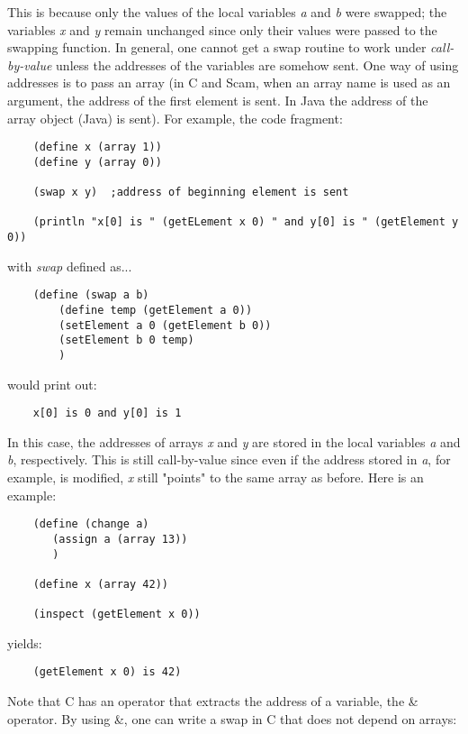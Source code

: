 This is because only the values of the local variables {\it a} and {\it b}
were swapped; the variables {\it x} and {\it y} remain unchanged
since only their values were passed to the swapping function.
In
general, one cannot get a swap routine to work under {\it call-by-value}
unless the addresses of the variables are somehow sent. One way of
using addresses is to pass an array (in C and Scam, when an array name
is used as an argument, the address of the first element is sent. In Java
the address of the array
object (Java) is sent). For example,
the code fragment:

\begin{verbatim}
    (define x (array 1))
    (define y (array 0))

    (swap x y)  ;address of beginning element is sent

    (println "x[0] is " (getELement x 0) " and y[0] is " (getElement y 0))
\end{verbatim}

with {\it swap} defined as...

\begin{verbatim}
    (define (swap a b)
        (define temp (getElement a 0))
        (setElement a 0 (getElement b 0))
        (setElement b 0 temp)
        )
\end{verbatim}

would print out:

\begin{verbatim}
    x[0] is 0 and y[0] is 1
\end{verbatim}

In this case, the addresses of arrays {\it x} and {\it y}
are stored in the local variables {\it a} and
{\it b}, respectively.
This is
still call-by-value since even if the address stored in {\it a}, for example,
is modified,
{\it x} still "points" to the same array as before. Here is an example:

\begin{verbatim}
    (define (change a)
       (assign a (array 13))
       )

    (define x (array 42))

    (inspect (getElement x 0))
\end{verbatim}

yields:

\begin{verbatim}
    (getElement x 0) is 42)
\end{verbatim}

Note that C has an operator that extracts the address of a variable, the
\& operator. By using \&, one can write a swap in C that does
not depend on arrays:

